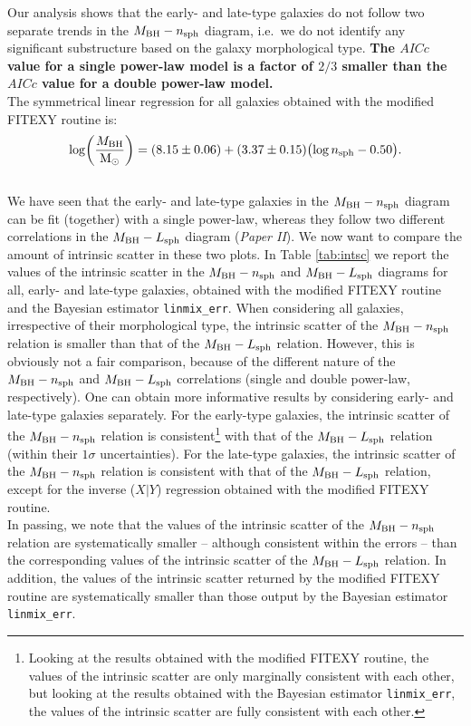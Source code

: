 \documentclass[preprint2]{emulateapj}
\begin{document}
Our analysis shows that the early- and late-type galaxies do not follow two separate trends 
in the $M_{\rm BH} - n_{\rm sph}$ diagram, 
i.e.~we do not identify any significant substructure based on the galaxy morphological type. 
{\bf The $AICc$ value for a single power-law model is a factor of $2/3$ smaller 
than the $AICc$ value for a double power-law model. } \\
The symmetrical linear regression for all galaxies obtained with the modified FITEXY routine is: 
\begin{equation*}
\log \biggl( \frac{M_{\rm BH}}{\rm M_\odot} \biggr) = (8.15 \pm 0.06) + (3.37 \pm 0.15) \bigl(\log n_{\rm sph} - 0.50 \bigr) . 
\end{equation*}
\\

We have seen that the early- and late-type galaxies in the $M_{\rm BH} - n_{\rm sph}$ diagram 
can be fit (together) with a single power-law, 
whereas they follow two different correlations in the $M_{\rm BH} - L_{\rm sph}$ diagram (\emph{Paper II}). 
We now want to compare the amount of intrinsic scatter in these two plots. 
In Table \ref{tab:intsc} we report the values of the intrinsic scatter 
in the $M_{\rm BH} - n_{\rm sph}$ and $M_{\rm BH} - L_{\rm sph}$ diagrams 
for all, early- and late-type galaxies, 
obtained with the modified FITEXY routine and the Bayesian estimator {\tt linmix\_err}. 
When considering all galaxies, irrespective of their morphological type, 
the intrinsic scatter of the $M_{\rm BH} - n_{\rm sph}$ relation is smaller than that of the $M_{\rm BH} - L_{\rm sph}$ relation. 
However, this is obviously not a fair comparison, 
because of the different nature of the $M_{\rm BH} - n_{\rm sph}$ and $M_{\rm BH} - L_{\rm sph}$ correlations 
(single and double power-law, respectively). 
One can obtain more informative results by considering early- and late-type galaxies separately. 
For the early-type galaxies, the intrinsic scatter of the $M_{\rm BH} - n_{\rm sph}$ relation is consistent\footnote{Looking 
at the results obtained with the modified FITEXY routine, 
the values of the intrinsic scatter are only marginally consistent with each other, 
but looking at the results obtained with the Bayesian estimator {\tt linmix\_err}, 
the values of the intrinsic scatter are fully consistent with each other. } 
with that of the $M_{\rm BH} - L_{\rm sph}$ relation (within their $1\sigma$ uncertainties). 
For the late-type galaxies, the intrinsic scatter of the $M_{\rm BH} - n_{\rm sph}$ relation is consistent with 
that of the $M_{\rm BH} - L_{\rm sph}$ relation, 
except for the inverse ($X|Y$) regression obtained with the modified FITEXY routine. \\
In passing, we note that the values of the intrinsic scatter of the $M_{\rm BH} - n_{\rm sph}$ relation 
are systematically smaller -- although consistent within the errors -- 
than the corresponding values of the intrinsic scatter of the $M_{\rm BH} - L_{\rm sph}$ relation.  
In addition, the values of the intrinsic scatter returned by the modified FITEXY routine are systematically smaller than 
those output by the Bayesian estimator {\tt linmix\_err}. 
\end{document}
